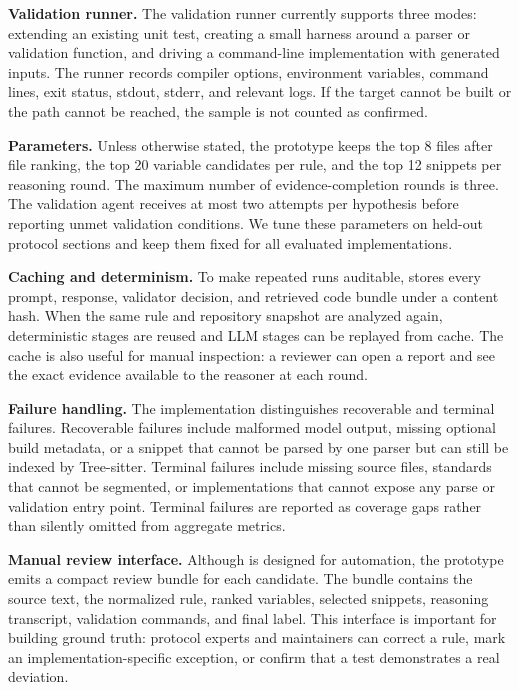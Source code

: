 \textbf{Validation runner.}
The validation runner currently supports three modes: extending an existing
unit test, creating a small harness around a parser or validation function, and
driving a command-line implementation with generated inputs. The runner records
compiler options, environment variables, command lines, exit status, stdout,
stderr, and relevant logs. If the target cannot be built or the path cannot be
reached, the sample is not counted as confirmed.

\textbf{Parameters.}
Unless otherwise stated, the prototype keeps the top 8 files after file
ranking, the top 20 variable candidates per rule, and the top 12 snippets per
reasoning round. The maximum number of evidence-completion rounds is three. The
validation agent receives at most two attempts per hypothesis before reporting
unmet validation conditions. We tune these parameters on held-out protocol
sections and keep them fixed for all evaluated implementations.

\textbf{Caching and determinism.}
To make repeated runs auditable, \tool{} stores every prompt, response,
validator decision, and retrieved code bundle under a content hash. When the
same rule and repository snapshot are analyzed again, deterministic stages are
reused and LLM stages can be replayed from cache. The cache is also useful for
manual inspection: a reviewer can open a report and see the exact evidence
available to the reasoner at each round.

\textbf{Failure handling.}
The implementation distinguishes recoverable and terminal failures. Recoverable
failures include malformed model output, missing optional build metadata, or a
snippet that cannot be parsed by one parser but can still be indexed by
Tree-sitter. Terminal failures include missing source files, standards that
cannot be segmented, or implementations that cannot expose any parse or
validation entry point. Terminal failures are reported as coverage gaps rather
than silently omitted from aggregate metrics.

\textbf{Manual review interface.}
Although \tool{} is designed for automation, the prototype emits a compact
review bundle for each candidate. The bundle contains the source text, the
normalized rule, ranked variables, selected snippets, reasoning transcript,
validation commands, and final label. This interface is important for building
ground truth: protocol experts and maintainers can correct a rule, mark an
implementation-specific exception, or confirm that a test demonstrates a real
deviation.
